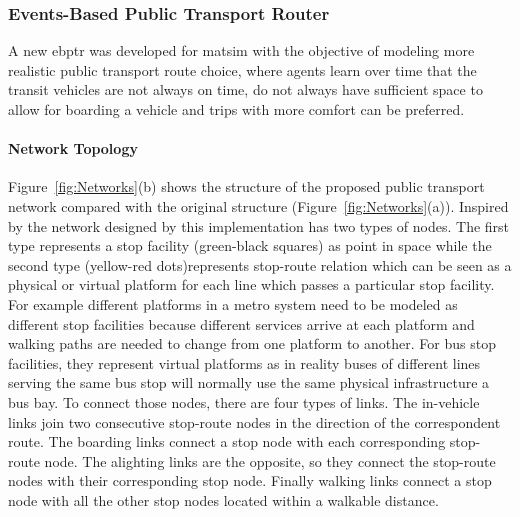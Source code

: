 \subsubsection{Events-Based Public Transport Router} 
\label{sec:RouterStructure}
A new \gls{ebptr} was developed for \gls{matsim} with the objective of modeling more realistic public transport route choice, where agents learn over time that the transit vehicles are not always on time, do not always have sufficient space to allow for boarding a vehicle and trips with more comfort can be preferred.

\paragraph{Network Topology}

Figure~\ref{fig:Networks}(b) shows the structure of the proposed public transport network compared with the original structure (Figure~\ref{fig:Networks}(a)). Inspired by the network designed by \citet{SpiessFlorian_TransResB_1989} this implementation has two types of nodes. The first type represents a stop facility (green-black squares) as point in space while the second type (yellow-red dots)represents stop-route relation which can be seen as a physical or virtual platform for each line which passes a particular stop facility. For example different platforms in a metro system need to be modeled as different stop facilities because different services arrive at each platform and walking paths are needed to change from one platform to another. For bus stop facilities, they represent virtual platforms as in reality buses of different lines serving the same bus stop will normally use the same physical infrastructure \eg a bus bay. To connect those nodes, there are four types of links. The in-vehicle links join two consecutive stop-route nodes in the direction of the correspondent route. The boarding links connect a stop node with each corresponding stop-route node. The alighting links are the opposite, so they connect the stop-route nodes with their corresponding stop node. Finally walking links connect a stop node with all the other stop nodes located within a walkable distance.

